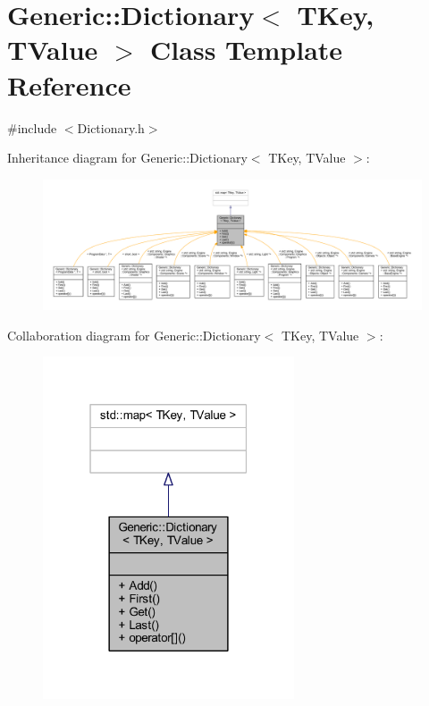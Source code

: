 \hypertarget{classGeneric_1_1Dictionary}{}\section{Generic\+:\+:Dictionary$<$ T\+Key, T\+Value $>$ Class Template Reference}
\label{classGeneric_1_1Dictionary}


{\ttfamily \#include $<$Dictionary.\+h$>$}



Inheritance diagram for Generic\+:\+:Dictionary$<$ T\+Key, T\+Value $>$\+:
\nopagebreak
\begin{figure}[H]
\begin{center}
\leavevmode
\includegraphics[width=350pt]{classGeneric_1_1Dictionary__inherit__graph}
\end{center}
\end{figure}


Collaboration diagram for Generic\+:\+:Dictionary$<$ T\+Key, T\+Value $>$\+:
\nopagebreak
\begin{figure}[H]
\begin{center}
\leavevmode
\includegraphics[width=211pt]{classGeneric_1_1Dictionary__coll__graph}
\end{center}
\end{figure}
